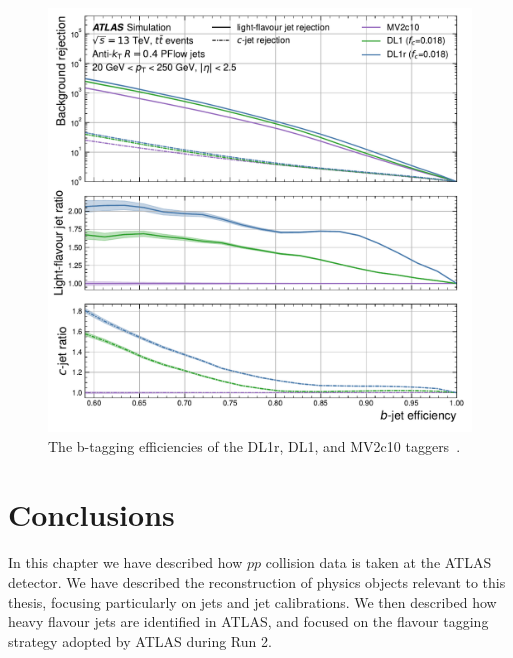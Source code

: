 \documentclass[10pt,a4paper]{book}
\begin{document}
\begin{figure}
    \centering
    \includegraphics[width=0.8\linewidth]{atlas/ftag/ebb.pdf}
    \caption{The b-tagging efficiencies of the DL1r, DL1, and MV2c10 taggers~\cite{ATLAS:2022qxm}.}
    \label{fig:ebb}
\end{figure}

\section{Conclusions}
In this chapter we have described how $pp$ collision data is taken at the ATLAS detector. We have described the reconstruction of physics objects relevant to this thesis, focusing particularly on jets and jet calibrations. We then described how heavy flavour jets are identified in ATLAS, and focused on the flavour tagging strategy adopted by ATLAS during Run 2.
\end{document}
